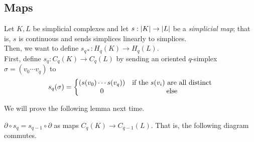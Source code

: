 \subsection*{Maps}
\sectionspace

Let $K, L$ be simplicial complexes and let $s : \abs{K} \to \abs{L}$ be a \emph{simplicial map}; that is, $s$ is continuous and sends simplices linearly to simplices.\\

Then, we want to define $s_{q*} : H_q(K) \to H_q(L)$.\\

First, define $s_q : C_q(K) \to C_q(L)$ by sending an oriented $q$-simplex $\sigma = (v_0 \cdots v_q)$ to
\[ s_q(\sigma) = \left\{\begin{matrix} (s(v_0) \cdots s(v_q)) & \tt{if the } s(v_i) \tt{ are all distinct} \\ 0 & \tt{else} \end{matrix}\right. \]

We will prove the following lemma next time.

\begin{lemma}
   
    $\partial \circ s_q = s_{q - 1} \circ \partial$ as maps $C_q(K) \to C_{q - 1}(L)$. That is, the following diagram commutes. 
    \begin{center}
    \end{center}
\end{lemma}
